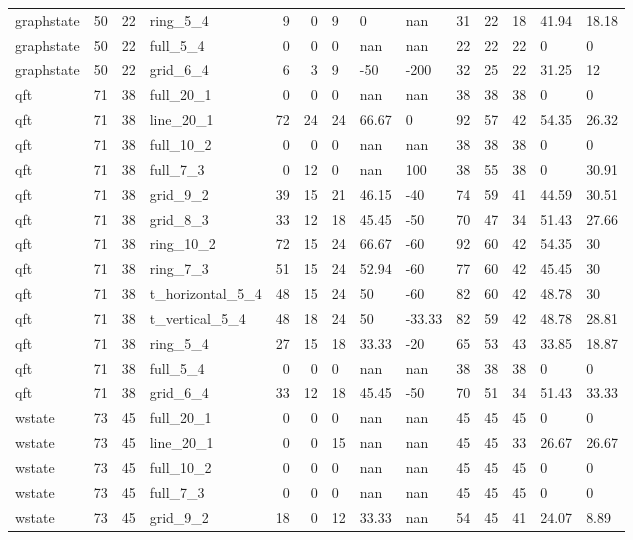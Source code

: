 \begin{longtable}{lrrlrrlllrrlll}
graphstate & 50 & 22 & ring\_5\_4 & 9 & 0 & 9 & 0 & nan & 31 & 22 & 18 & 41.94 & 18.18 \\
graphstate & 50 & 22 & full\_5\_4 & 0 & 0 & 0 & nan & nan & 22 & 22 & 22 & 0 & 0 \\
graphstate & 50 & 22 & grid\_6\_4 & 6 & 3 & 9 & -50 & -200 & 32 & 25 & 22 & 31.25 & 12 \\
qft & 71 & 38 & full\_20\_1 & 0 & 0 & 0 & nan & nan & 38 & 38 & 38 & 0 & 0 \\
qft & 71 & 38 & line\_20\_1 & 72 & 24 & 24 & 66.67 & 0 & 92 & 57 & 42 & 54.35 & 26.32 \\
qft & 71 & 38 & full\_10\_2 & 0 & 0 & 0 & nan & nan & 38 & 38 & 38 & 0 & 0 \\
qft & 71 & 38 & full\_7\_3 & 0 & 12 & 0 & nan & 100 & 38 & 55 & 38 & 0 & 30.91 \\
qft & 71 & 38 & grid\_9\_2 & 39 & 15 & 21 & 46.15 & -40 & 74 & 59 & 41 & 44.59 & 30.51 \\
qft & 71 & 38 & grid\_8\_3 & 33 & 12 & 18 & 45.45 & -50 & 70 & 47 & 34 & 51.43 & 27.66 \\
qft & 71 & 38 & ring\_10\_2 & 72 & 15 & 24 & 66.67 & -60 & 92 & 60 & 42 & 54.35 & 30 \\
qft & 71 & 38 & ring\_7\_3 & 51 & 15 & 24 & 52.94 & -60 & 77 & 60 & 42 & 45.45 & 30 \\
qft & 71 & 38 & t\_horizontal\_5\_4 & 48 & 15 & 24 & 50 & -60 & 82 & 60 & 42 & 48.78 & 30 \\
qft & 71 & 38 & t\_vertical\_5\_4 & 48 & 18 & 24 & 50 & -33.33 & 82 & 59 & 42 & 48.78 & 28.81 \\
qft & 71 & 38 & ring\_5\_4 & 27 & 15 & 18 & 33.33 & -20 & 65 & 53 & 43 & 33.85 & 18.87 \\
qft & 71 & 38 & full\_5\_4 & 0 & 0 & 0 & nan & nan & 38 & 38 & 38 & 0 & 0 \\
qft & 71 & 38 & grid\_6\_4 & 33 & 12 & 18 & 45.45 & -50 & 70 & 51 & 34 & 51.43 & 33.33 \\
wstate & 73 & 45 & full\_20\_1 & 0 & 0 & 0 & nan & nan & 45 & 45 & 45 & 0 & 0 \\
wstate & 73 & 45 & line\_20\_1 & 0 & 0 & 15 & nan & nan & 45 & 45 & 33 & 26.67 & 26.67 \\
wstate & 73 & 45 & full\_10\_2 & 0 & 0 & 0 & nan & nan & 45 & 45 & 45 & 0 & 0 \\
wstate & 73 & 45 & full\_7\_3 & 0 & 0 & 0 & nan & nan & 45 & 45 & 45 & 0 & 0 \\
wstate & 73 & 45 & grid\_9\_2 & 18 & 0 & 12 & 33.33 & nan & 54 & 45 & 41 & 24.07 & 8.89 \\

\end{longtable}
